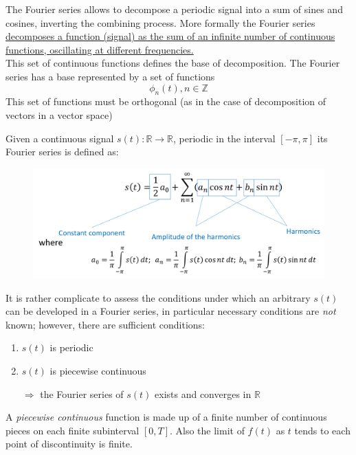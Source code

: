 The Fourier series allows to decompose a periodic signal into a sum of sines and cosines, inverting the combining process.
More formally the Fourier series\ul{ decomposes a function (signal) as the sum of an infinite number of continuous functions, oscillating at
different frequencies.}\\
This set of continuous functions defines the base of
decomposition.
The Fourier series has a base represented by a set of functions
\[
   \phi_n(t) , n \in \mathbb{Z}
\]
This set of functions must be orthogonal (as in the case of decomposition of vectors in a vector space)
\newpage
\begin{definition}
   Given a continuous signal $s(t) : \mathbb{R} \rightarrow \mathbb{R}$, periodic in the interval $[-\pi, \pi]$ its Fourier
   series is defined as:
   \begin{figure}[htbp]
      \centering
      \includegraphics{images/fourierseries.png}
      \label{fig:fourierseries}
   \end{figure}
\end{definition}

It is rather complicate to assess the conditions under which an arbitrary $s(t)$ can be developed in a Fourier series, in particular necessary conditions are \textit{not} known; however, there are sufficient conditions:
\begin{theorem}[Dirichlet]
   
   \nl
   \begin{enumerate}
      \item $s(t)$ is periodic
      \item $s(t)$ is piecewise continuous
      \item[$\Rightarrow$] the Fourier series of $s(t)$ exists and converges in $\mathbb{R}$
   \end{enumerate}
   \end{theorem}
A \textit{piecewise continuous} function is made up of a finite number of continuous pieces on each finite subinterval $[0,T]$. Also the
limit of $f(t)$ as $t$ tends to each point of discontinuity is finite.

